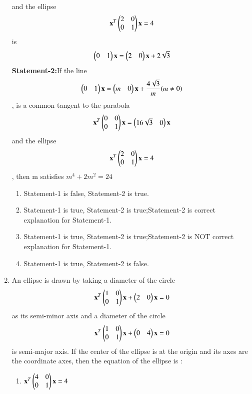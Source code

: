 \documentclass[journal,12pt,twocolumn]{IEEEtran}
\begin{document}
\begin{enumerate}[label=\arabic*]
\begin{align}
    \end{align} and the ellipse 
    \begin{align}
    \mathbf{x}^T\begin{pmatrix}2&0\\0&1\end{pmatrix}\mathbf{x}=4
    \end{align} is 
    \begin{align}
    \begin{pmatrix}0&1\end{pmatrix}\mathbf{x}=\begin{pmatrix}2&0\end{pmatrix}\mathbf{x}+2\sqrt{3}
    \end{align}
    \textbf{Statement-2:}If the line
    \begin{align}
    \begin{pmatrix}0&1\end{pmatrix}\mathbf{x}=\begin{pmatrix}m&0\end{pmatrix}\mathbf{x}+\frac{4\sqrt{3}}{m} (m \neq 0)
    \end{align}, is a common tangent to the parabola 
    \begin{align}
    \mathbf{x}^T\begin{pmatrix}0&0\\0&1\end{pmatrix}\mathbf{x}=\begin{pmatrix}16\sqrt{3}&0\end{pmatrix}\mathbf{x}
    \end{align} and the ellipse 
    \begin{align}
    \mathbf{x}^T\begin{pmatrix}2&0\\0&1\end{pmatrix}\mathbf{x}=4
    \end{align}, then m satisfies $m^4+2m^2=24$
    \begin{enumerate}
    \item Statement-1 is false, Statement-2 is true.
    \item Statement-1 is true, Statement-2 is true;Statement-2 is correct explanation for Statement-1.
    \item Statement-1 is true, Statement-2 is true;Statement-2 is NOT correct explanation for Statement-1.
    \item Statement-1 is true, Statement-2 is false.
    \end{enumerate} 
    \item An ellipse is drawn by taking a diameter of the circle 
    \begin{align}
    \mathbf{x}^T\begin{pmatrix}1&0\\0&1\end{pmatrix}\mathbf{x}+\begin{pmatrix}2&0\end{pmatrix}\mathbf{x}=0
    \end{align} as its semi-minor axis and a diameter of the circle 
    \begin{align}
    \mathbf{x}^T\begin{pmatrix}1&0\\0&1\end{pmatrix}\mathbf{x}+\begin{pmatrix}0&4\end{pmatrix}\mathbf{x}=0
    \end{align} is semi-major axis. If the center of the ellipse is at the origin and its axes are the coordinate axes, then the equation of the ellipse is :
    \begin{enumerate}
    \item $\mathbf{x}^T\begin{pmatrix}4&0\\0&1\end{pmatrix}\mathbf{x}=4$

\end{enumerate}
\end{enumerate}
\end{document}
